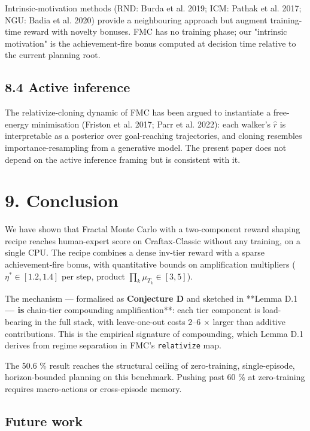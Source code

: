 Intrinsic-motivation methods (RND: Burda et al. 2019; ICM: Pathak et
al. 2017; NGU: Badia et al. 2020) provide a neighbouring approach but
augment training-time reward with novelty bonuses. FMC has no training
phase; our "intrinsic motivation" is the achievement-fire bonus
computed at decision time relative to the current planning root.

\subsection{8.4 Active inference}

The relativize-cloning dynamic of FMC has been argued to instantiate a
free-energy minimisation (Friston et al. 2017; Parr et al. 2022): each
walker's $\widehat{r}$ is interpretable as a posterior over goal-reaching
trajectories, and cloning resembles importance-resampling from a
generative model. The present paper does not depend on the active
inference framing but is consistent with it.

\hrulefill

\section{9. Conclusion}

We have shown that Fractal Monte Carlo with a two-component reward
shaping recipe reaches human-expert score on Craftax-Classic without
any training, on a single CPU. The recipe combines a dense inv-tier
reward with a sparse achievement-fire bonus, with quantitative bounds
on amplification multipliers ($\eta^* \in [1.2, 1.4]$ per step, product
$\prod_k \mu_{T_k} \in [3, 5]$).

The mechanism — formalised as \textbf{Conjecture D} and sketched in **Lemma
D.1\textbf{ — is }chain-tier compounding amplification**: each tier
component is load-bearing in the full stack, with leave-one-out costs
2–6 × larger than additive contributions. This is the empirical
signature of compounding, which Lemma D.1 derives from regime
separation in FMC's \texttt{relativize} map.

The 50.6 \% result reaches the structural ceiling of zero-training,
single-episode, horizon-bounded planning on this benchmark. Pushing
past 60 \% at zero-training requires macro-actions or cross-episode
memory.

\subsection{Future work}

